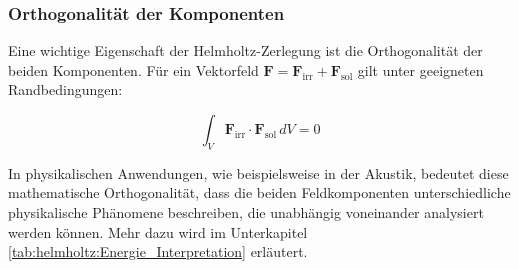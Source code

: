 \subsubsection{Orthogonalität der Komponenten}

Eine wichtige Eigenschaft der Helmholtz-Zerlegung ist die Orthogonalität der beiden Komponenten. Für ein Vektorfeld $\mathbf{F} = \mathbf{F}_{\text{irr}} + \mathbf{F}_{\text{sol}}$ gilt unter geeigneten Randbedingungen:

\begin{equation}
\int_V \mathbf{F}_{\text{irr}} \cdot \mathbf{F}_{\text{sol}} \, dV = 0
\end{equation}
 
\noindent In physikalischen Anwendungen, wie beispielsweise in der Akustik, bedeutet diese mathematische Orthogonalität, dass die beiden Feldkomponenten unterschiedliche physikalische Phänomene beschreiben, die unabhängig voneinander analysiert werden können. Mehr dazu wird im Unterkapitel \ref{tab:helmholtz:Energie_Interpretation} erläutert.


